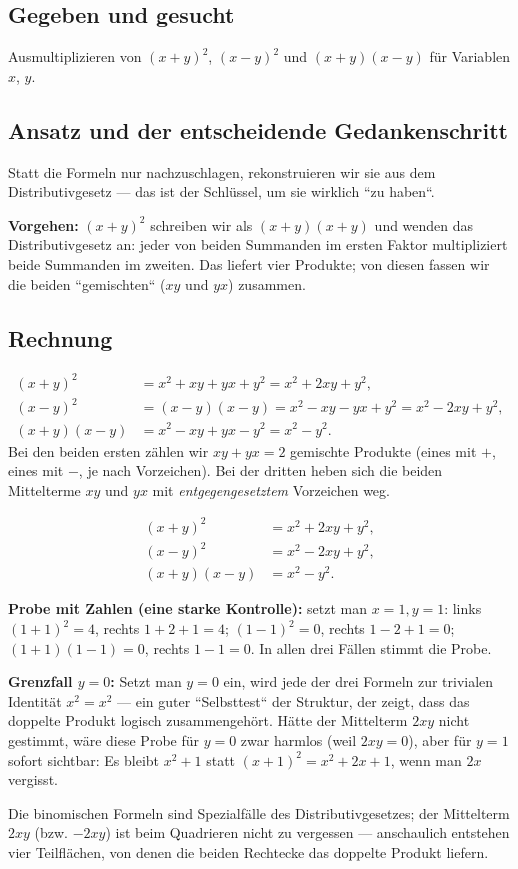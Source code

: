 

\subsection*{Gegeben und gesucht}
Ausmultiplizieren von $(x+y)^2$, $(x-y)^2$ und $(x+y)(x-y)$ für Variablen
$x$, $y$.

\subsection*{Ansatz und der entscheidende Gedankenschritt}
Statt die Formeln nur nachzuschlagen, rekonstruieren wir sie aus dem
Distributivgesetz --- das ist der Schlüssel, um sie wirklich ``zu haben``.

\textbf{Vorgehen:} $(x+y)^2$ schreiben wir als $(x+y)(x+y)$ und wenden das
Distributivgesetz an: jeder von beiden Summanden im ersten Faktor
multipliziert beide Summanden im zweiten. Das liefert vier Produkte;
von diesen fassen wir die beiden ``gemischten`` ($xy$ und $yx$) zusammen.

\subsection*{Rechnung}
\begin{align}
  (x+y)^2 &= x^2 + xy + yx + y^2 = x^2+2xy+y^2, \\
  (x-y)^2 &= (x-y)(x-y)=x^2-xy-yx+y^2 = x^2-2xy+y^2, \\
  (x+y)(x-y) &= x^2-xy+yx-y^2 = x^2-y^2 .
\end{align}
Bei den beiden ersten zählen wir $xy+yx=2$ gemischte Produkte (eines mit
$+$, eines mit $-$, je nach Vorzeichen). Bei der dritten heben sich die
beiden Mittelterme $xy$ und $yx$ mit \emph{entgegengesetztem} Vorzeichen
weg.

\begin{ergebnis}
\begin{align*}
  (x+y)^2 &= x^2+2xy+y^2, \\
  (x-y)^2 &= x^2-2xy+y^2, \\
  (x+y)(x-y) &= x^2-y^2 .
\end{align*}
\end{ergebnis}

\begin{kontrolle}
\textbf{Probe mit Zahlen (eine starke Kontrolle):} setzt man $x=1,
y=1$: links $(1+1)^2=4$, rechts $1+2+1=4$; $(1-1)^2=0$, rechts $1-2+1=0$;
$(1+1)(1-1)=0$, rechts $1-1=0$. In allen drei Fällen stimmt die Probe.

\textbf{Grenzfall $y=0$:} Setzt man $y=0$ ein, wird jede der drei Formeln
zur trivialen Identität $x^2=x^2$ --- ein guter ``Selbsttest`` der
Struktur, der zeigt, dass das doppelte Produkt logisch zusammengehört.
Hätte der Mittelterm $2xy$ nicht gestimmt, wäre diese Probe für $y=0$
zwar harmlos (weil $2xy=0$), aber für $y=1$ sofort sichtbar: Es bleibt
$x^2+1$ statt $(x+1)^2=x^2+2x+1$, wenn man $2x$ vergisst.
\end{kontrolle}

\begin{merksatz}
Die binomischen Formeln sind Spezialfälle des Distributivgesetzes; der
Mittelterm $2xy$ (bzw. $-2xy$) ist beim Quadrieren nicht zu vergessen ---
anschaulich entstehen vier Teilflächen, von denen die beiden Rechtecke
das doppelte Produkt liefern.
\end{merksatz}
